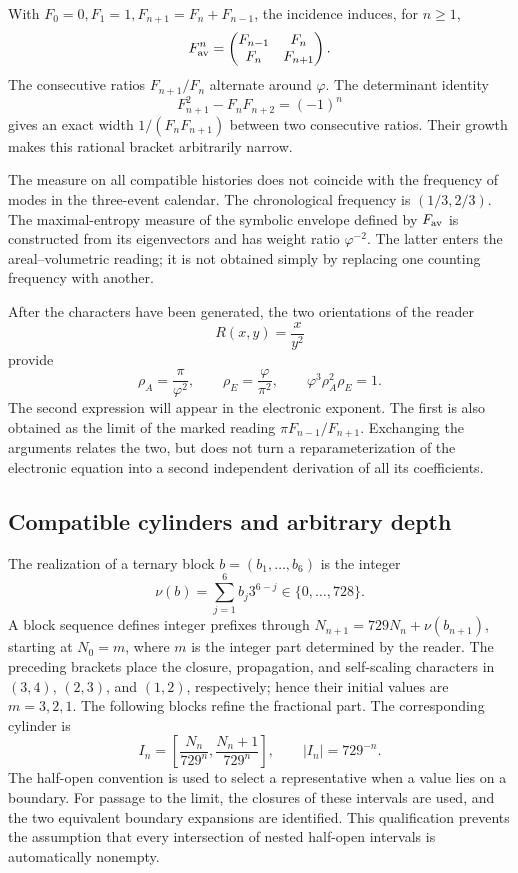 With \(F_0=0,F_1=1,F_{n+1}=F_n+F_{n-1}\), the incidence induces, for \(n\geq1\),
\[
 F_{\rm av}^n=\begin{pmatrix}F_{n-1}&F_n\\F_n&F_{n+1}\end{pmatrix}.
\]
The consecutive ratios \(F_{n+1}/F_n\) alternate around \(\varphi\). The determinant identity
\[
 F_{n+1}^2-F_nF_{n+2}=(-1)^n
\]
gives an exact width \(1/(F_nF_{n+1})\) between two consecutive ratios. Their growth makes this rational bracket arbitrarily narrow.

The measure on all compatible histories does not coincide with the frequency of modes in the three-event calendar. The chronological frequency is \((1/3,2/3)\). The maximal-entropy measure of the symbolic envelope defined by \(F_{\rm av}\) is constructed from its eigenvectors and has weight ratio \(\varphi^{-2}\). The latter enters the areal--volumetric reading; it is not obtained simply by replacing one counting frequency with another.

After the characters have been generated, the two orientations of the reader
\[
 R(x,y)=\frac{x}{y^2}
\]
provide
\begin{equation}
 \rho_A=\frac\pi{\varphi^2},\qquad
 \rho_E=\frac\varphi{\pi^2},\qquad
 \varphi^3\rho_A^2\rho_E=1.
 \label{eq:areal-electron}
\end{equation}
The second expression will appear in the electronic exponent. The first is also obtained as the limit of the marked reading \(\pi F_{n-1}/F_{n+1}\). Exchanging the arguments relates the two, but does not turn a reparameterization of the electronic equation into a second independent derivation of all its coefficients.



\subsection{Compatible cylinders and arbitrary depth}

The realization of a ternary block \(b=(b_1,\ldots,b_6)\) is the integer
\[
 \nu(b)=\sum_{j=1}^6b_j3^{6-j}\in\{0,\ldots,728\}.
\]
A block sequence defines integer prefixes through \(N_{n+1}=729N_n+\nu(b_{n+1})\), starting at \(N_0=m\), where \(m\) is the integer part determined by the reader. The preceding brackets place the closure, propagation, and self-scaling characters in \((3,4)\), \((2,3)\), and \((1,2)\), respectively; hence their initial values are \(m=3,2,1\). The following blocks refine the fractional part. The corresponding cylinder is
\begin{equation}
 I_n=\left[\frac{N_n}{729^n},\frac{N_n+1}{729^n}\right],
 \qquad |I_n|=729^{-n}.
 \label{eq:cilindro}
\end{equation}
The half-open convention is used to select a representative when a value lies on a boundary. For passage to the limit, the closures of these intervals are used, and the two equivalent boundary expansions are identified. This qualification prevents the assumption that every intersection of nested half-open intervals is automatically nonempty.

